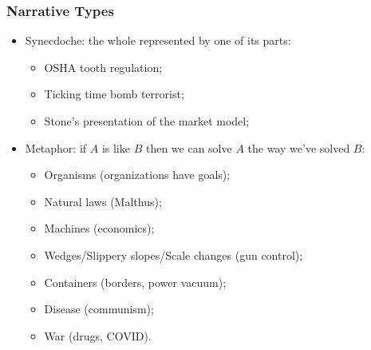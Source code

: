 \documentclass[aspectratio=169]{beamer}
\theoremstyle{principle}
\begin{document}
\begin{frame}
\frametitle{Narrative Types}
\begin{itemize}
\item Synecdoche: the whole represented by one of its parts:
\begin{itemize}
\item OSHA tooth regulation;
\item Ticking time bomb terrorist;
\item Stone's presentation of the market model;
\end{itemize}
\bigskip
\bigskip
\item Metaphor: if $A$ is like $B$ then we can solve $A$ the way we've solved $B$:
\begin{itemize}
\item Organisms (organizations have goals);
\item Natural laws (Malthus); 
\item Machines (economics);
\item Wedges/Slippery slopes/Scale changes (gun control);
\item Containers (borders, power vacuum);
\item Disease (communism);
\item War (drugs, COVID).
\end{itemize}
\end{itemize}
\end{frame}

\end{document}
